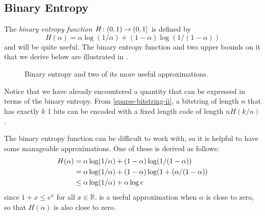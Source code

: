 \documentclass{patmorin}
\begin{document}
\subsection{Binary Entropy}

The \emph{binary entropy function} $H\colon (0,1)\to(0,1]$ is defined by
\[
    H(\alpha) = \alpha\log(1/\alpha) + (1-\alpha)\log(1/(1-\alpha)) 
\]
and will be quite useful.  The binary entropy function and two upper bounds on it that we derive below are illustrated in .

\begin{figure}
  \caption{Binary entropy and two of its more useful approximations.}
\end{figure}

Notice that we have already encountered a quantity that can be expressed in terms of the binary entropy.  From \eqref{sparse-bitstring-ii}, a bitstring of length $n$ that has exactly $k$ 1 bits can be encoded with a fixed length code of length
$nH(k/n)$.

The binary entropy function can be difficult to work with, so it is
helpful to have some manageable approximations.  One of these is derived
as follows:
\begin{align}
  H(\alpha) & = \alpha\log(1/\alpha) + (1-\alpha)\log(1/(1-\alpha)) \notag \\
       & = \alpha\log(1/\alpha) + (1-\alpha)\log(1+(\alpha/(1-\alpha)) \notag \\
       & \le \alpha\log(1/\alpha) + \alpha\log e \eqlabel{entropy-i} 
\end{align}
since $1+x\le e^x$ for all $x\in\mathbb{R}$.  is a
useful approximation when $\alpha$ is close to zero, so that $H(\alpha)$ is also
close to zero.
\end{document}

